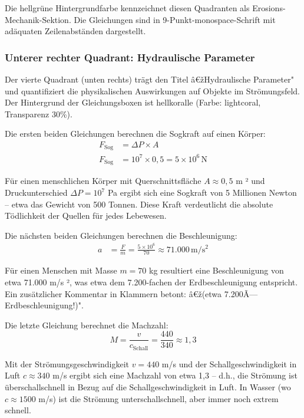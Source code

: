 Die hellgrüne Hintergrundfarbe kennzeichnet diesen Quadranten als Erosions-Mechanik-Sektion. Die Gleichungen sind in 9-Punkt-monospace-Schrift mit adäquaten Zeilenabständen dargestellt.

\subsubsection*{Unterer rechter Quadrant: Hydraulische Parameter}

Der vierte Quadrant (unten rechts) trägt den Titel â€žHydraulische Parameter" und quantifiziert die physikalischen Auswirkungen auf Objekte im Strömungsfeld. Der Hintergrund der Gleichungsboxen ist hellkoralle (Farbe: lightcoral, Transparenz 30\%).

Die ersten beiden Gleichungen berechnen die Sogkraft auf einen Körper:
\begin{align*}
F_{\mathrm{Sog}} &= \Delta P \times A \\
F_{\mathrm{Sog}} &= 10^7 \times 0{,}5 = 5 \times 10^6 \, \mathrm{N}
\end{align*}

Für einen menschlichen Körper mit Querschnittsfläche $A \approx 0{,}5$ m ² und Druckunterschied $\Delta P = 10^7$ Pa ergibt sich eine Sogkraft von 5 Millionen Newton -- etwa das Gewicht von 500 Tonnen. Diese Kraft verdeutlicht die absolute Tödlichkeit der Quellen für jedes Lebewesen.

Die nächsten beiden Gleichungen berechnen die Beschleunigung:
\begin{align*}
a &= \frac{F}{m} = \frac{5 \times 10^6}{70} \approx 71{.}000 \, \mathrm{m/s^2}
\end{align*}

Für einen Menschen mit Masse $m = 70$ kg resultiert eine Beschleunigung von etwa 71.000 m/s ², was etwa dem 7.200-fachen der Erdbeschleunigung entspricht. Ein zusätzlicher Kommentar in Klammern betont: â€ž(etwa 7.200Ã— Erdbeschleunigung!)".

Die letzte Gleichung berechnet die Machzahl:
\begin{equation*}
M = \frac{v}{c_{\mathrm{Schall}}} = \frac{440}{340} \approx 1{,}3
\end{equation*}

Mit der Strömungsgeschwindigkeit $v = 440$ m/s und der Schallgeschwindigkeit in Luft $c \approx 340$ m/s ergibt sich eine Machzahl von etwa 1,3 -- d.h., die Strömung ist überschallschnell in Bezug auf die Schallgeschwindigkeit in Luft. In Wasser (wo $c \approx 1500$ m/s) ist die Strömung unterschallschnell, aber immer noch extrem schnell.

